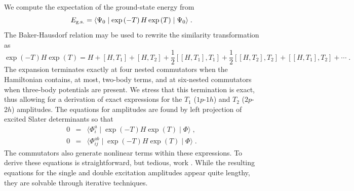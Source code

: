 \documentclass{article}
\begin{document}
We compute the expectation of the ground-state energy from
\begin{equation}
E_{\rm g.s.}=\langle\Psi_0\mid \exp\left(-T\right) H \exp\left(T\right)
\mid\Psi_0\rangle\;. 
\end{equation}
The Baker-Hausdorf relation may be used to rewrite the similarity
transformation as
\begin{equation}
\exp\left(-T\right) H \exp\left(T\right) =
H+\left[H,T_1\right]+\left[H,T_2\right]
+\frac{1}{2}\left[\left[H,T_1\right],T_1\right]
+\frac{1}{2}\left[\left[H,T_2\right],T_2\right]
+\left[\left[H,T_1\right],T_2\right]+\cdots \;.
\end{equation}
The expansion terminates exactly at four nested commutators  when
the Hamiltonian contains, at most, two-body terms, and at six-nested 
commutators when  three-body potentials are present. 
We stress that
this termination is exact, thus allowing for a derivation of exact
expressions for the $T_1$ ($1p$-$1h$) and 
$T_2$ ($2p$-$2h$) amplitudes. 
The equations for amplitudes are found by left projection of
excited Slater determinants
so that
\begin{eqnarray}
0 &=& \langle\Phi_i^a\mid 
\exp\left(-T\right) H \exp\left(T\right) \mid \Phi\rangle\;,  \nonumber \\ 
0 &=& \langle\Phi_{ij}^{ab}\mid 
\exp\left(-T\right) H \exp\left(T\right) \mid \Phi\rangle \;.
\label{project_eqns}
\end{eqnarray}
The commutators also generate nonlinear terms within these expressions. 
To derive these equations
is straightforward, but tedious, work \cite{comp_chem_rev00}.
While the resulting equations for the single and double excitation
amplitudes  appear quite lengthy, they are 
solvable through iterative techniques. 
\end{document}
